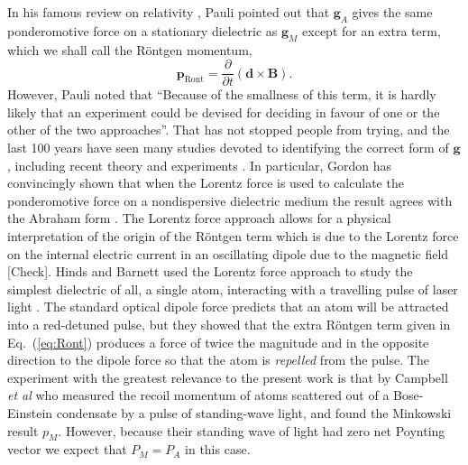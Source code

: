\documentclass[twocolumn,english,pra,aps,superscriptaddress,floatfix]{revtex4-1}
\begin{document}
In his famous review on relativity \cite{pauli}, Pauli pointed out that $\mathbf{g}_{A}$ gives the same ponderomotive force on a stationary dielectric as $\mathbf{g}_{M}$ except for an extra term, which we shall call the R\"{o}ntgen momentum,
\begin{equation}
\mathbf{p}_{\mathrm{Ront}}= \frac{\partial}{\partial t} (\mathbf{d} \times \mathbf{B} ) .
\label{eq:Ront}
\end{equation}
However, Pauli noted that ``Because of the smallness of this term, it is hardly likely that an experiment could be devised for deciding in favour of one or the other of the two approaches''. That has not stopped people from trying, and the last 100 years have seen many studies devoted to identifying the correct form of $\mathbf{g}$, including recent theory and experiments  \cite{Gordon73,chiao,Loudon05,ketterle,feng,mansuripur,hinds09,barnett10}. In particular, Gordon has convincingly shown that when the Lorentz force is used to calculate the ponderomotive force on a nondispersive dielectric medium the result agrees with the Abraham form \cite{Gordon73}. The Lorentz force approach allows for a physical interpretation of the origin of the R\"{o}ntgen term which is due to the Lorentz force on the internal electric current in an oscillating dipole due to the magnetic field [Check]. Hinds and Barnett used the Lorentz force approach to study the simplest dielectric of all, a single atom, interacting with a travelling pulse of laser light \cite{hinds09}. The standard optical dipole force predicts that an atom will be attracted into a red-detuned pulse, but they showed that the extra R\"{o}ntgen term given in Eq.\ (\ref{eq:Ront}) produces a force of twice the magnitude and in the opposite direction to the dipole force so that the atom is \emph{repelled} from the pulse. The experiment with the greatest relevance to the present work is that by Campbell \emph{et al} \cite{ketterle} who measured the recoil momentum of atoms scattered out of a Bose-Einstein condensate by a pulse of standing-wave light, and found the Minkowski result $p_M$. However, because their standing wave of light had zero net Poynting vector we expect that $P_M=P_A$ in this case. 
\end{document}
